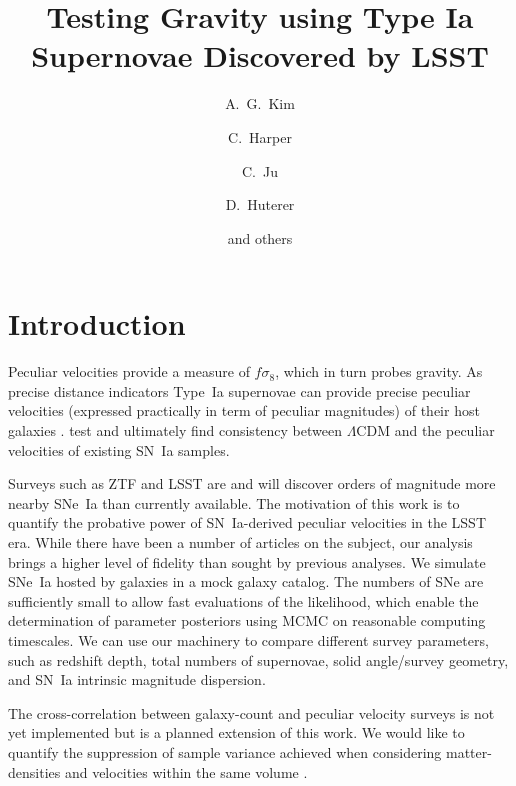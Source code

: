 \documentclass{aastex62}   	%
\begin{document}
\title{Testing Gravity using Type Ia Supernovae Discovered by LSST}
\author[0000-0001-6315-8743]{A.~G.~Kim}
\author{C.~Harper}
\author{C.~Ju}
\author{D.~Huterer}

\author{and others}



\section{Introduction}
Peculiar velocities provide a measure of $f\sigma_8$, which in turn probes gravity.  As precise distance indicators Type~Ia supernovae
can provide precise peculiar velocities (expressed practically in term of peculiar magnitudes)
of their host galaxies \citep{2006PhRvD..73l3526H,2011ApJ...741...67D}.
\citet{2015JCAP...12..033H, 2017JCAP...05..015H}  test and ultimately find consistency between
$\Lambda$CDM and the peculiar velocities of existing SN~Ia samples.

Surveys such as ZTF and LSST are and will discover orders of magnitude more nearby SNe~Ia than currently available.
The motivation of this work is to quantify the probative power of SN~Ia-derived peculiar velocities in the LSST era.
While there have been a number of articles on the subject,
our analysis brings a higher level of fidelity than sought by previous analyses.  We simulate SNe~Ia hosted by galaxies in a mock galaxy
catalog. The numbers of SNe are sufficiently small to allow fast evaluations of the likelihood, which enable the determination of parameter
posteriors using MCMC on reasonable computing timescales.   We can use our machinery to 
compare different survey parameters, such as redshift depth, total numbers of supernovae,
solid angle/survey geometry, and SN~Ia intrinsic magnitude dispersion.

The cross-correlation between galaxy-count and peculiar velocity surveys is not yet implemented but is a planned extension of this work.  We would like to
quantify the suppression of sample variance achieved when considering matter-densities and velocities 
within the same volume \citep{2007PhRvL..99h1301G}.
\end{document}

